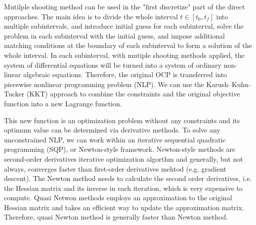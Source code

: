 \documentclass  [
  paper    = a4,
  BCOR     = 10mm,
  twoside,
  fontsize = 12pt,
  fleqn,
  toc      = bibnumbered,
  toc      = listofnumbered,
  numbers  = noendperiod,
  headings = normal,
  listof   = leveldown,
  version  = 3.03
]                                       {scrreprt}
\newcommand{\<}{\langle}
\renewcommand{\>}{\rangle}
\begin{document}
Mutilple shooting method can be used in the "first discretize" part of the direct approaches. The main idea is to divide the whole interval $t \in [t_0, t_f]$ into multiple subintervals, and introduce initial guess for each subinterval,  solve the problem in each subinterval with the initial guess, and impose additional matching conditions at the boundary of each subinterval to form a solution of the whole interval. In each subinterval, with mutiple shooting methods applied, the system of differential equations will be turned into a system of ordinary non-linear algebraic equations. Therefore, the original OCP is transferred into piecewise nonlinear programming problem (NLP). We can use the Karush–Kuhn–Tucker (KKT) approach to combine the constraints and the original objective function into a new Lagrange function. 

This new function is an optimization problem without any constraints and its optimum value can be determined via derivative methods. To solve any unconstrained NLP, we can work within an iterative sequential quadratic programming (SQP), or Newton-style framework. Newton-style methods are second-order derivatives iterative optimization algorthm and generally, but not always, converges faster than first-order derivatives mehtod (e.g. gradient descent). The Newton method needs to calculate the second order derivatives, i.e. the Hessian matrix and its inverse in each iteration, which is very expensive to compute. Quasi Netwon methods employs an approximation to the original Hessian matrix and takes an efficient way to update the approximation matrix. Therefore, quasi Newton method is generally faster than Newton method. 

\end{document}
